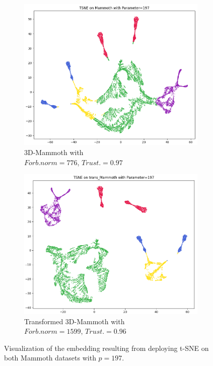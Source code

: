 \begin{figure}[!]
     \centering
     \begin{subfigure}[t]{0.49\columnwidth}
    	\centering
    	\includegraphics[width=\columnwidth]{images/LOW_Mammoth_tsne_197.png}
    	\caption{3D-Mammoth with \\ $Forb.norm=776$, $Trust.=0.97$}
        \label{fig:LOW_Mammoth_tsne_197}
    \end{subfigure}
     \hfill
     \begin{subfigure}[t]{0.49\columnwidth}
    	\centering
    	\includegraphics[width=\columnwidth]{images/LOW_trans_Mammoth_tsne_197.png}
    	\caption{Transformed 3D-Mammoth with \\ $Forb.norm=1599$, $Trust.=0.96$}
        \label{fig:LOW_trans_Mammoth_tsne_197}
    \end{subfigure}
     \caption[3D-Mammoth vs. Transformed 3D-Mammoth Visualization]{Visualization of the embedding resulting from deploying t-SNE on both Mammoth datasets with $p=197$.}
    \label{fig:mamm_vs_trans_197}
\end{figure}

